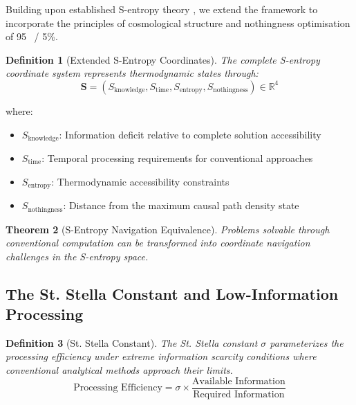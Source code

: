 \documentclass[11pt,a4paper]{article}
\newtheorem{theorem}{Theorem}[section]
\newtheorem{definition}[theorem]{Definition}
\theoremstyle{remark}
\begin{document}
Building upon established S-entropy theory \cite{sachikonye2024sentropy}, we extend the framework to incorporate the principles of cosmological structure and nothingness optimisation of 95 \ / 5\%.

\begin{definition}[Extended S-Entropy Coordinates]
The complete S-entropy coordinate system represents thermodynamic states through:
\begin{equation}
\mathbf{S} = (S_{\text{knowledge}}, S_{\text{time}}, S_{\text{entropy}}, S_{\text{nothingness}}) \in \mathbb{R}^4
\label{eq:extended_s_coords}
\end{equation}
\end{definition}

where:
\begin{itemize}
\item $S_{\text{knowledge}}$: Information deficit relative to complete solution accessibility
\item $S_{\text{time}}$: Temporal processing requirements for conventional approaches  
\item $S_{\text{entropy}}$: Thermodynamic accessibility constraints
\item $S_{\text{nothingness}}$: Distance from the maximum causal path density state
\end{itemize}

\begin{theorem}[S-Entropy Navigation Equivalence]
Problems solvable through conventional computation can be transformed into coordinate navigation challenges in the S-entropy space.
\end{theorem}

\subsection{The St. Stella Constant and Low-Information Processing}

\begin{definition}[St. Stella Constant]
The St. Stella constant $\sigma$ parameterizes the processing efficiency under extreme information scarcity conditions where conventional analytical methods approach their limits.
\begin{equation}
\text{Processing Efficiency} = \sigma \times \frac{\text{Available Information}}{\text{Required Information}}
\label{eq:stella_efficiency}
\end{equation}
\end{definition}
\end{document}
